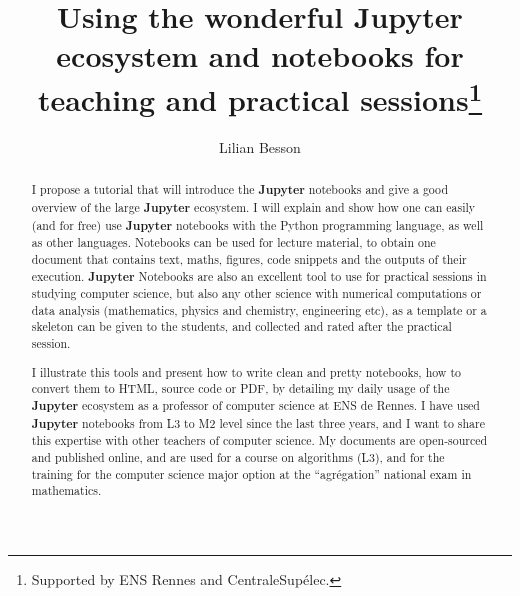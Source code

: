 \documentclass[runningheads]{llncs}
\newcommand{\Jupyter}{\textbf{Jupyter}}
\begin{document}
%
\title{Using the wonderful \Jupyter{} ecosystem and notebooks for teaching and practical sessions\thanks{Supported by ENS Rennes and CentraleSup{\'e}lec.}}
%
%
\author{Lilian Besson}
%
%
%
\maketitle              %
%
\begin{abstract}

    I propose a tutorial that will introduce the \Jupyter{} notebooks and give a good overview of the large \Jupyter{} ecosystem.
    I will explain and show how one can easily (and for free) use \Jupyter{} notebooks with the Python programming language, as well as other languages.
    Notebooks can be used for lecture material, to obtain one document that contains text, maths, figures, code snippets and the outputs of their execution.
    \Jupyter{} Notebooks are also an excellent tool to use for practical sessions in studying computer science, but also any other science with numerical computations or data analysis (mathematics, physics and chemistry, engineering etc), as a template or a skeleton can be given to the students, and collected and rated after the practical session.

    I illustrate this tools and present how to write clean and pretty notebooks, how to convert them to HTML, source code or PDF, by detailing my daily usage of the \Jupyter{} ecosystem as a professor of computer science at ENS de Rennes.
    I have used \Jupyter{} notebooks from L3 to M2 level since the last three years, and I want to share this expertise with other teachers of computer science.
    My documents are open-sourced and published online, and are used for a course on algorithms (L3), and for the training for the computer science major option at the ``agr{\'e}gation'' national exam in mathematics.


\end{abstract}
%
%
%
\end{document}
